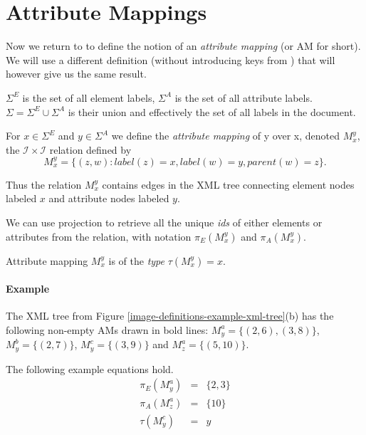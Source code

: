 \section{Attribute Mappings}
\label{section-definitions-ams}

Now we return to \cite{fidax} to define the notion of an \textit{attribute mapping} (or AM for short). 
We will use a different definition (without introducing keys from \cite{keX}) that will however give us the same result.

\begin{define}
	$\Sigma^E$ is the set of all element labels, $\Sigma^A$ is the set of all attribute labels. $\Sigma = \Sigma^E \cup \Sigma^A$ is their union and effectively the set of all labels in the document.
\end{define}

\begin{define}
	For $x \in \Sigma^E$ and $y \in \Sigma^A$ we define the \textit{attribute mapping} of y over x, denoted $M_{x}^{y}$, the $\mathcal{I} \times \mathcal{I}$ relation defined by
	\[M_{x}^{y} = \{ (z,w): label(z) = x, label(w) = y, parent(w) = z \}.\]
\end{define}

Thus the relation $M_{x}^{y}$ contains edges in the XML tree connecting element nodes labeled $x$ and attribute nodes labeled $y$.

We can use projection to retrieve all the unique \textit{ids} of either elements or attributes from the relation, with notation $\pi_E(M_{x}^{y})$ and $\pi_A(M_{x}^{y})$.

\begin{define}
	Attribute mapping $M_{x}^{y}$ is of the \textit{type} $\tau(M_{x}^{y}) = x$.
\end{define}

\paragraph{Example}
The XML tree from Figure \ref{image-definitions-example-xml-tree}(b) has the following non-empty AMs drawn in bold lines: $M_{y}^{a} = \{(2,6), (3,8)\}$, $M_{y}^{b} = \{(2,7)\}$, $M_{y}^{c} = \{(3,9)\}$ and $M_{z}^{a} = \{(5,10)\}$.

The following example equations hold.
\begin{eqnarray*}
\pi_E(M_{y}^{a}) & = & \{2, 3\} \\
\pi_A(M_{z}^{a}) & = & \{10\} \\
\tau(M_{y}^{c}) & = & y
\end{eqnarray*}

